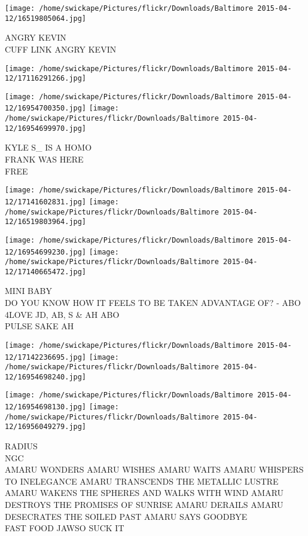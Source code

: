 \documentclass[10pt,letterpaper]{article}
\begin{document}
\vspace{0.25in}
\texttt{[image: /home/swickape/Pictures/flickr/Downloads/Baltimore 2015-04-12/16519805064.jpg]}

ANGRY KEVIN\\
CUFF LINK ANGRY KEVIN
\pagebreak

\texttt{[image: /home/swickape/Pictures/flickr/Downloads/Baltimore 2015-04-12/17116291266.jpg]}

\vspace{0.25in}
\texttt{[image: /home/swickape/Pictures/flickr/Downloads/Baltimore 2015-04-12/16954700350.jpg]}
\texttt{[image: /home/swickape/Pictures/flickr/Downloads/Baltimore 2015-04-12/16954699970.jpg]}

KYLE S\_ IS A HOMO\\
FRANK WAS HERE\\
FREE
\pagebreak

\texttt{[image: /home/swickape/Pictures/flickr/Downloads/Baltimore 2015-04-12/17141602831.jpg]}
\texttt{[image: /home/swickape/Pictures/flickr/Downloads/Baltimore 2015-04-12/16519803964.jpg]}

\texttt{[image: /home/swickape/Pictures/flickr/Downloads/Baltimore 2015-04-12/16954699230.jpg]}
\texttt{[image: /home/swickape/Pictures/flickr/Downloads/Baltimore 2015-04-12/17140665472.jpg]}

MINI BABY\\
DO YOU KNOW HOW IT FEELS TO BE TAKEN ADVANTAGE OF? {-} ABO\\
4LOVE JD, AB, S \& AH ABO\\
PULSE SAKE AH
\pagebreak

\texttt{[image: /home/swickape/Pictures/flickr/Downloads/Baltimore 2015-04-12/17142236695.jpg]}
\texttt{[image: /home/swickape/Pictures/flickr/Downloads/Baltimore 2015-04-12/16954698240.jpg]}

\texttt{[image: /home/swickape/Pictures/flickr/Downloads/Baltimore 2015-04-12/16954698130.jpg]}
\texttt{[image: /home/swickape/Pictures/flickr/Downloads/Baltimore 2015-04-12/16956049279.jpg]}

RADIUS\\
NGC\\
AMARU WONDERS AMARU WISHES AMARU WAITS AMARU WHISPERS TO INELEGANCE AMARU TRANSCENDS THE METALLIC LUSTRE AMARU WAKENS THE SPHERES AND WALKS WITH WIND AMARU DESTROYS THE PROMISES OF SUNRISE AMARU DERAILS AMARU DESECRATES THE SOILED PAST AMARU SAYS GOODBYE\\
FAST FOOD JAWSO SUCK IT
\pagebreak
\end{document}
